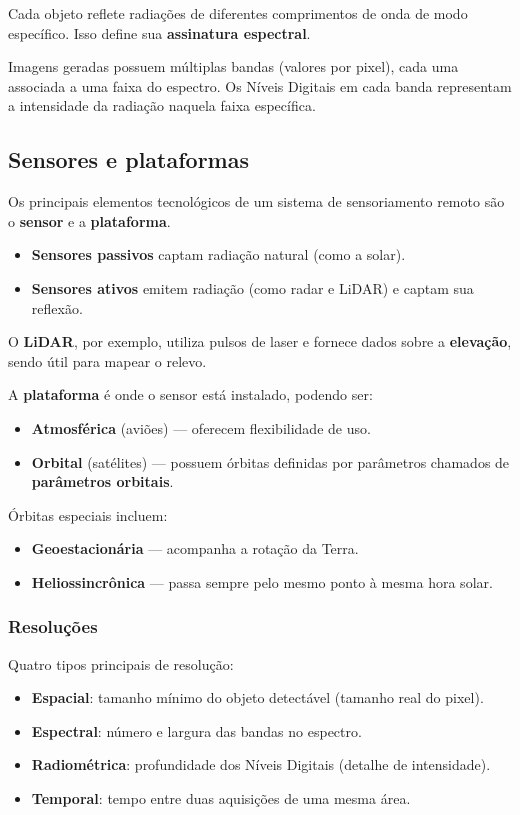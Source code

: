 Cada objeto reflete radiações de diferentes comprimentos de onda de modo específico. Isso define sua \textbf{assinatura espectral}.

Imagens geradas possuem múltiplas bandas (valores por pixel), cada uma associada a uma faixa do espectro. Os Níveis Digitais em cada banda representam a intensidade da radiação naquela faixa específica.

\subsection{Sensores e plataformas}

Os principais elementos tecnológicos de um sistema de sensoriamento remoto são o \textbf{sensor} e a \textbf{plataforma}.

\begin{itemize}
\item \textbf{Sensores passivos} captam radiação natural (como a solar).
\item \textbf{Sensores ativos} emitem radiação (como radar e LiDAR) e captam sua reflexão.
\end{itemize}

O \textbf{LiDAR}, por exemplo, utiliza pulsos de laser e fornece dados sobre a \textbf{elevação}, sendo útil para mapear o relevo.

A \textbf{plataforma} é onde o sensor está instalado, podendo ser:
\begin{itemize}
\item \textbf{Atmosférica} (aviões) — oferecem flexibilidade de uso.
\item \textbf{Orbital} (satélites) — possuem órbitas definidas por parâmetros chamados de \textbf{parâmetros orbitais}.
\end{itemize}

Órbitas especiais incluem:
\begin{itemize}
\item \textbf{Geoestacionária} — acompanha a rotação da Terra.
\item \textbf{Heliossincrônica} — passa sempre pelo mesmo ponto à mesma hora solar.
\end{itemize}

\subsubsection{Resoluções}

Quatro tipos principais de resolução:

\begin{itemize}
\item \textbf{Espacial}: tamanho mínimo do objeto detectável (tamanho real do pixel).
\item \textbf{Espectral}: número e largura das bandas no espectro.
\item \textbf{Radiométrica}: profundidade dos Níveis Digitais (detalhe de intensidade).
\item \textbf{Temporal}: tempo entre duas aquisições de uma mesma área.
\end{itemize}

